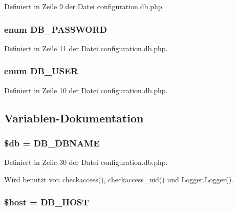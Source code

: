 Definiert in Zeile 9 der Datei configuration.db.php.
\subsubsection{\setlength{\rightskip}{0pt plus 5cm}enum {\bf DB\_\-PASSWORD}}\label{configuration_8db_8php_7e717bf6e7045cd892772c56c69d9cb1}




Definiert in Zeile 11 der Datei configuration.db.php.
\subsubsection{\setlength{\rightskip}{0pt plus 5cm}enum {\bf DB\_\-USER}}\label{configuration_8db_8php_559678de5d107264d3c60fd66099eec4}




Definiert in Zeile 10 der Datei configuration.db.php.

\subsection{Variablen-Dokumentation}
\subsubsection{\setlength{\rightskip}{0pt plus 5cm}\$db = {\bf DB\_\-DBNAME}}\label{configuration_8db_8php_1fa3127fc82f96b1436d871ef02be319}




Definiert in Zeile 30 der Datei configuration.db.php.

Wird benutzt von checkaccess(), checkaccess\_\-uid() und Logger.Logger().
\subsubsection{\setlength{\rightskip}{0pt plus 5cm}\$host = {\bf DB\_\-HOST}}\label{configuration_8db_8php_711797613cb863ca0756df789c396bf2}




